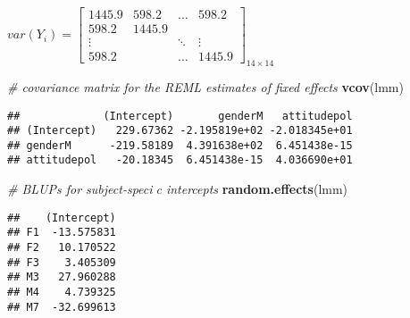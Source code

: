 \documentclass[]{article}
\newenvironment{Shaded}{\begin{snugshade}}{\end{snugshade}}
\newcommand{\KeywordTok}[1]{\textcolor[rgb]{0.13,0.29,0.53}{\textbf{#1}}}
\newcommand{\CommentTok}[1]{\textcolor[rgb]{0.56,0.35,0.01}{\textit{#1}}}
\newcommand{\NormalTok}[1]{#1}
\begin{document}
\(var(Y_{i})=\begin{bmatrix}  1445.9 & 598.2 & \dots & 598.2 \\  598.2 & 1445.9 & \\  \vdots & &\ddots & \vdots\\  598.2 & & \dots & 1445.9  \end{bmatrix}_{14 \times 14}\)

\begin{Shaded}
\begin{Highlighting}[]
\CommentTok{# covariance matrix for the REML estimates of fixed effects}
\KeywordTok{vcov}\NormalTok{(lmm)}
\end{Highlighting}
\end{Shaded}

\begin{verbatim}
##             (Intercept)       genderM   attitudepol
## (Intercept)   229.67362 -2.195819e+02 -2.018345e+01
## genderM      -219.58189  4.391638e+02  6.451438e-15
## attitudepol   -20.18345  6.451438e-15  4.036690e+01
\end{verbatim}

\begin{Shaded}
\begin{Highlighting}[]
\CommentTok{# BLUPs for subject-speci􏰍c intercepts}
\KeywordTok{random.effects}\NormalTok{(lmm)}
\end{Highlighting}
\end{Shaded}

\begin{verbatim}
##    (Intercept)
## F1  -13.575831
## F2   10.170522
## F3    3.405309
## M3   27.960288
## M4    4.739325
## M7  -32.699613
\end{verbatim}
\end{document}

